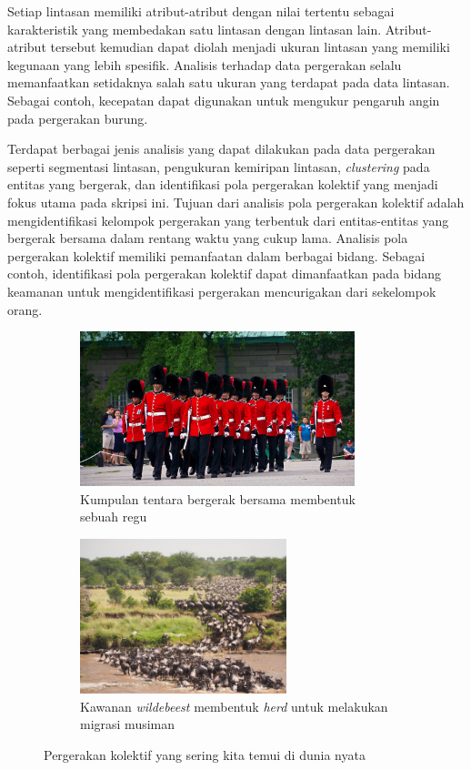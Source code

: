 \documentclass[a4paper,twoside]{article}
\begin{document}
Setiap lintasan memiliki atribut-atribut dengan nilai tertentu sebagai karakteristik yang membedakan satu lintasan dengan lintasan lain. Atribut-atribut tersebut kemudian dapat diolah menjadi ukuran lintasan yang memiliki kegunaan yang lebih spesifik. Analisis terhadap data pergerakan selalu memanfaatkan setidaknya salah satu ukuran yang terdapat pada data lintasan. Sebagai contoh, kecepatan dapat digunakan untuk mengukur pengaruh angin pada pergerakan burung.

Terdapat berbagai jenis analisis yang dapat dilakukan pada data pergerakan seperti segmentasi lintasan, pengukuran kemiripan lintasan, \textit{clustering} pada entitas yang bergerak, dan identifikasi pola pergerakan kolektif yang menjadi fokus utama pada skripsi ini. Tujuan dari analisis pola pergerakan kolektif adalah mengidentifikasi kelompok pergerakan yang terbentuk dari entitas-entitas yang bergerak bersama dalam rentang waktu yang cukup lama. Analisis pola pergerakan kolektif memiliki pemanfaatan dalam berbagai bidang. Sebagai contoh, identifikasi pola pergerakan kolektif dapat dimanfaatkan pada bidang keamanan untuk mengidentifikasi pergerakan mencurigakan dari sekelompok orang.

\iffalse 

\begin{figure}[h]
    \centering
    \begin{subfigure}[h]{0.45\textwidth}
        \centering
        \includegraphics[width=\textwidth, height=4.5cm]{Gambar/army.jpg}
        \caption{Kumpulan tentara bergerak bersama membentuk sebuah regu\protect\footnotemark}
    \end{subfigure}
    \begin{subfigure}[h]{0.45\textwidth}
        \centering
        \includegraphics[width=\textwidth, height=4.5cm]{Gambar/wildebeest.jpg}
        \caption{Kawanan \textit{wildebeest} membentuk \textit{herd} untuk melakukan migrasi musiman\protect\footnotemark}
    \end{subfigure}
    \caption[Pergerakan kolektif dunia nyata]{Pergerakan kolektif yang sering kita temui di dunia nyata}
    \label{bab1:collective-movement}
\end{figure}
\end{document}
